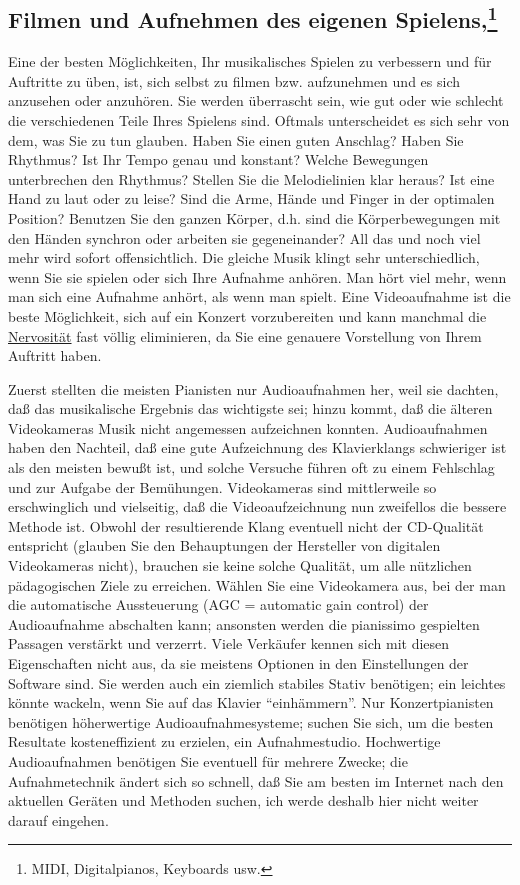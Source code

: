 
\subsection{Filmen und Aufnehmen des eigenen Spielens,\footnote{MIDI, Digitalpianos, Keyboards usw.}}
\label{c1iii13} 

Eine der besten Möglichkeiten, Ihr musikalisches Spielen zu verbessern und für Auftritte zu üben, ist, sich selbst zu filmen bzw. aufzunehmen und es sich anzusehen oder anzuhören.
Sie werden überrascht sein, wie gut oder wie schlecht die verschiedenen Teile Ihres Spielens sind.
Oftmals unterscheidet es sich sehr von dem, was Sie zu tun glauben.
Haben Sie einen guten Anschlag?
Haben Sie Rhythmus?
Ist Ihr Tempo genau und konstant?
Welche Bewegungen unterbrechen den Rhythmus?
Stellen Sie die Melodielinien klar heraus?
Ist eine Hand zu laut oder zu leise?
Sind die Arme, Hände und Finger in der optimalen Position?
Benutzen Sie den ganzen Körper, d.h. sind die Körperbewegungen mit den Händen synchron oder arbeiten sie gegeneinander?
All das und noch viel mehr wird sofort offensichtlich.
Die gleiche Musik klingt sehr unterschiedlich, wenn Sie sie spielen oder sich Ihre Aufnahme anhören.
Man hört viel mehr, wenn man sich eine Aufnahme anhört, als wenn man spielt.
Eine Videoaufnahme ist die beste Möglichkeit, sich auf ein Konzert vorzubereiten und kann manchmal die \hyperref[c1iii15]{Nervosität} fast völlig eliminieren, da Sie eine genauere Vorstellung von Ihrem Auftritt haben.

Zuerst stellten die meisten Pianisten nur Audioaufnahmen her, weil sie dachten, daß das musikalische Ergebnis das wichtigste sei; hinzu kommt, daß die älteren Videokameras Musik nicht angemessen aufzeichnen konnten.
Audioaufnahmen haben den Nachteil, daß eine gute Aufzeichnung des Klavierklangs schwieriger ist als den meisten bewußt ist, und solche Versuche führen oft zu einem Fehlschlag und zur Aufgabe der Bemühungen.
Videokameras sind mittlerweile so erschwinglich und vielseitig, daß die Videoaufzeichnung nun zweifellos die bessere Methode ist.
Obwohl der resultierende Klang eventuell nicht der CD-Qualität entspricht (glauben Sie den Behauptungen der Hersteller von digitalen Videokameras nicht), brauchen sie keine solche Qualität, um alle nützlichen pädagogischen Ziele zu erreichen.
Wählen Sie eine Videokamera aus, bei der man die automatische Aussteuerung (AGC = automatic gain control) der Audioaufnahme abschalten kann; ansonsten werden die pianissimo gespielten Passagen verstärkt und verzerrt.
Viele Verkäufer kennen sich mit diesen Eigenschaften nicht aus, da sie meistens Optionen in den Einstellungen der Software sind.
Sie werden auch ein ziemlich stabiles Stativ benötigen; ein leichtes könnte wackeln, wenn Sie auf das Klavier \enquote{einhämmern}.
Nur Konzertpianisten benötigen höherwertige Audioaufnahmesysteme; suchen Sie sich, um die besten Resultate kosteneffizient zu erzielen, ein Aufnahmestudio. 
Hochwertige Audioaufnahmen benötigen Sie eventuell für mehrere Zwecke; die Aufnahmetechnik ändert sich so schnell, daß Sie am besten im Internet nach den aktuellen Geräten und Methoden suchen, ich werde deshalb hier nicht weiter darauf eingehen.

